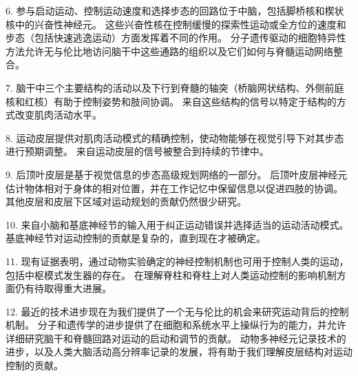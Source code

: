 6. 参与启动运动、控制运动速度和选择步态的回路位于中脑，包括脚桥核和楔状核中的兴奋性神经元。
这些兴奋性核在控制缓慢的探索性运动或全方位的速度和步态（包括快速逃逸运动）方面发挥着不同的作用。
分子遗传驱动的细胞特异性方法允许无与伦比地访问脑干中这些通路的组织以及它们如何与脊髓运动网络整合。


7. 脑干中三个主要结构的活动以及下行到脊髓的轴突（桥脑网状结构、外侧前庭核和红核）有助于控制姿势和肢间协调。
来自这些结构的信号以特定于结构的方式改变肌肉活动水平。


8. 运动皮层提供对肌肉活动模式的精确控制，使动物能够在视觉引导下对其步态进行预期调整。
来自运动皮层的信号被整合到持续的节律中。


9. 后顶叶皮层是基于视觉信息的步态高级规划网络的一部分。
后顶叶皮层神经元估计物体相对于身体的相对位置，并在工作记忆中保留信息以促进四肢的协调。
其他皮层和皮层下区域对运动规划的贡献仍然很少研究。


10. 来自小脑和基底神经节的输入用于纠正运动错误并选择适当的运动活动模式。
基底神经节对运动控制的贡献是复杂的，直到现在才被确定。


11. 现有证据表明，通过动物实验确定的神经控制机制也可用于控制人类的运动，包括中枢模式发生器的存在。
在理解脊柱和脊柱上对人类运动控制的影响机制方面仍有待取得重大进展。


12. 最近的技术进步现在为我们提供了一个无与伦比的机会来研究运动背后的控制机制。
分子和遗传学的进步提供了在细胞和系统水平上操纵行为的能力，并允许详细研究脑干和脊髓回路对运动的启动和调节的贡献。
动物多神经元记录技术的进步，以及人类大脑活动高分辨率记录的发展，将有助于我们理解皮层结构对运动控制的贡献。

